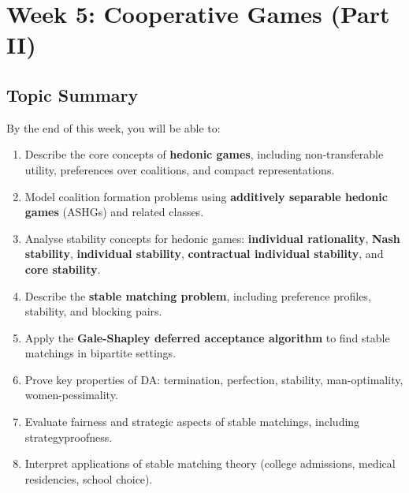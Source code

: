 \section{Week 5: Cooperative Games (Part II)}

\subsection{Topic Summary}

\begin{keybox}
By the end of this week, you will be able to:
\begin{enumerate}
  \item Describe the core concepts of \textbf{hedonic games}, including non-transferable utility, preferences over coalitions, and compact representations.
  \item Model coalition formation problems using \textbf{additively separable hedonic games} (ASHGs) and related classes.
  \item Analyse stability concepts for hedonic games: \textbf{individual rationality}, \textbf{Nash stability}, \textbf{individual stability}, \textbf{contractual individual stability}, and \textbf{core stability}.
  \item Describe the \textbf{stable matching problem}, including preference profiles, stability, and blocking pairs.
  \item Apply the \textbf{Gale-Shapley deferred acceptance algorithm} to find stable matchings in bipartite settings.
  \item Prove key properties of DA: termination, perfection, stability, man-optimality, women-pessimality.
  \item Evaluate fairness and strategic aspects of stable matchings, including strategyproofness.
  \item Interpret applications of stable matching theory (college admissions, medical residencies, school choice).
\end{enumerate}
\end{keybox}

\separator

